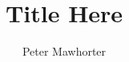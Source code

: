 \documentclass[11pt,letterpaper,twoside,openright]{book}
\title{Title Here}
\author{Peter Mawhorter}
\begin{document}
\frontmatter



\doublespacing

\mainmatter




\backmatter
\end{document}
